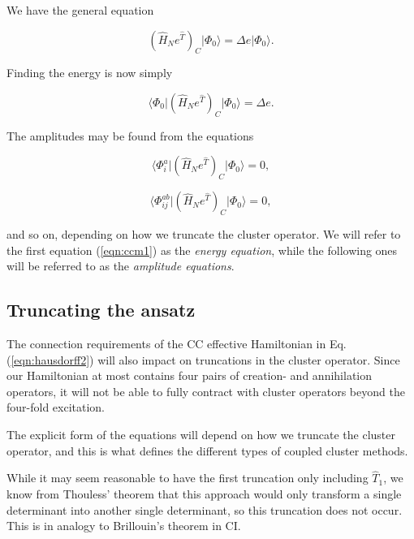 We have the general equation 

\begin{equation}
(\hat{H}_Ne^{\hat{T}})_C \vert \Phi_0 \rangle = \Delta e \vert \Phi_0 \rangle.
\end{equation}

Finding the energy is now simply

\begin{equation}
\langle \Phi_0 \vert (\hat{H}_Ne^{\hat{T}})_C \vert \Phi_0 \rangle = \Delta e  .
\label{eqn:ccm1}
\end{equation}

The amplitudes may be found from the equations 

\begin{equation}
\langle \Phi_i^a \vert (\hat{H}_Ne^{\hat{T}})_C \vert \Phi_0 \rangle = 0  ,
\label{eqn:ccm2}
\end{equation}

\begin{equation}
\langle \Phi_{ij}^{ab} \vert (\hat{H}_Ne^{\hat{T}})_C \vert \Phi_0 \rangle = 0 ,
\label{eqn:ccm3}
\end{equation}

and so on, depending on how we truncate the cluster operator. We will refer to the first equation (\ref{eqn:ccm1}) as the \emph{energy equation}, while the following ones will be referred to as the \emph{amplitude equations}. 

\subsection{Truncating the ansatz}

The connection requirements of the CC effective Hamiltonian in Eq. (\ref{eqn:hausdorff2}) will also impact on truncations in the cluster operator. Since our Hamiltonian at most contains four pairs of creation- and annihilation operators, it will not be able to fully contract with cluster operators beyond the four-fold excitation. 

The explicit form of the equations will depend on how we truncate the cluster operator, and this is what defines the different types of coupled cluster methods. 

While it may seem reasonable to have the first truncation only including $\hat{T}_1$, we know from Thouless' theorem that this approach would only transform a single determinant into another single determinant, so this truncation does not occur. This is in analogy to Brillouin's theorem in CI. \cite{ShavittBartlett2009}

